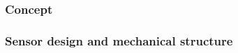 \subsubsection{Concept}

\subsubsection{Sensor design and mechanical structure}




\begin{comment}
\subsection{CMOS MAPS}

\end{comment}





\begin{comment}
SuperKEKB is already the world's highest-luminosity collider and it aims to reach a new peaks luminosity [of 6.3 $\dot 10^{35}$ $cm^{-2}s^{-1}$] in the future by further increasing the beam-currents and reducing the beam-size at the interaction point by squeezing the betatron function down to $\beta^{*}_{y}$ = 0.3 mm (mentioned in section REFERENCE). For this reason, it's necessary to understand how to mitigate the beam backgrounds where possible and how to cope with the consequent challenges. 
\end{comment}


\begin{comment}
[So it is a of a great importance simulate and measure the background to check on the state of the detector and the machine but also to predict how the conditions could change.]
In figure .... the Belle II background level measured in..... is shown. Current background rates in the experiment are acceptable and above all in most cases well below the limits (listed??). 
\end{comment}
